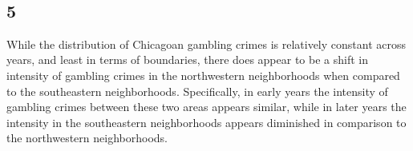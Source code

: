 \documentclass[11pt]{article}
\begin{document}
    \begin{center}
    \end{center}
    { \hspace*{\fill} \\}
    
    \begin{center}
    \end{center}
    { \hspace*{\fill} \\}
    
    \begin{center}
    \end{center}
    { \hspace*{\fill} \\}
    
    \begin{center}
    \end{center}
    { \hspace*{\fill} \\}
    
    \begin{center}
    \end{center}
    { \hspace*{\fill} \\}
    
    \begin{center}
    \end{center}
    { \hspace*{\fill} \\}
    
    \subsection{5}\label{section}

While the distribution of Chicagoan gambling crimes is relatively
constant across years, and least in terms of boundaries, there does
appear to be a shift in intensity of gambling crimes in the northwestern
neighborhoods when compared to the southeastern neighborhoods.
Specifically, in early years the intensity of gambling crimes between
these two areas appears similar, while in later years the intensity in
the southeastern neighborhoods appears diminished in comparison to the
northwestern neighborhoods.
\end{document}
